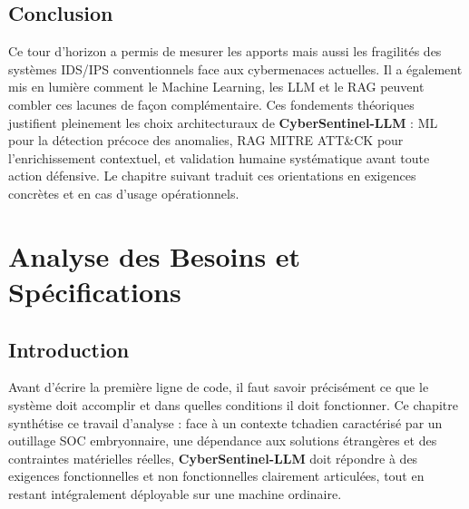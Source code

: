 \documentclass[12pt,a4paper]{report}
\begin{document}
\section*{Conclusion}
\begin{onehalfspace}
Ce tour d'horizon a permis de mesurer les apports mais aussi les fragilités
des systèmes IDS/IPS conventionnels face aux cybermenaces actuelles. Il a
également mis en lumière comment le Machine Learning, les LLM et le RAG
peuvent combler ces lacunes de façon complémentaire. Ces fondements
théoriques justifient pleinement les choix architecturaux de
\textbf{CyberSentinel-LLM} : ML pour la détection précoce des anomalies,
RAG MITRE ATT\&CK pour l'enrichissement contextuel, et validation humaine
systématique avant toute action défensive. Le chapitre suivant traduit ces
orientations en exigences concrètes et en cas d'usage opérationnels.
\end{onehalfspace}

\newpage

\chapter{Analyse des Besoins et Spécifications}

\section*{Introduction}
\begin{onehalfspace}
Avant d'écrire la première ligne de code, il faut savoir précisément ce
que le système doit accomplir et dans quelles conditions il doit fonctionner.
Ce chapitre synthétise ce travail d'analyse : face à un contexte tchadien
caractérisé par un outillage SOC embryonnaire, une dépendance aux solutions
étrangères et des contraintes matérielles réelles, \textbf{CyberSentinel-LLM}
doit répondre à des exigences fonctionnelles et non fonctionnelles clairement
articulées, tout en restant intégralement déployable sur une machine
ordinaire.
\end{onehalfspace}
\end{document}
